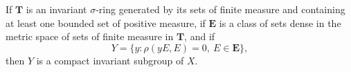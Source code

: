 If $\mathbf{T}$ is an invariant $\sigma$-ring generated by its sets of finite measure and containing at least one bounded set of positive measure, if $\mathbf{E}$ is a class of sets dense in the metric space of sets of finite measure in $\mathbf{T}$, and if $$Y = \{y : \rho(yE, E) = 0,\ E \in \mathbf{E}\},$$ then $Y$ is a compact invariant subgroup of $X$.